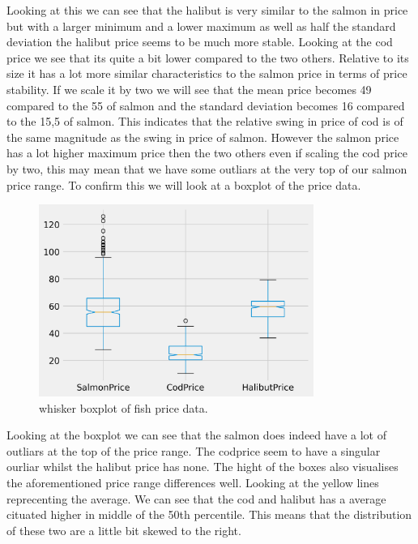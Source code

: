 Looking at this we can see that the halibut is very similar to the salmon in price but with a larger minimum and a lower maximum as well as half the standard deviation the halibut price seems to be much more stable. Looking at the cod price we see that its quite a bit lower compared to the two others. Relative to its size it has a lot more similar characteristics to the salmon price in terms of price stability. If we scale it by two we will see that the mean price becomes 49 compared to the 55 of salmon and the standard deviation becomes 16 compared to the 15,5 of salmon. This indicates that the relative swing in price of cod is of the same magnitude as the swing in price of salmon. However the salmon price has a lot higher maximum price then the two others even if scaling the cod price by two, this may mean that we have some outliars at the very top of our salmon price range. To confirm this we will look at a boxplot of the price data.

\begin{figure}[H]
    \centering
    \includegraphics[width=0.8\textwidth]{data/Figures/Descriptive/Whisker.png}
    \caption[Whisker boxplot of fish price data]{whisker boxplot of fish price data.}\label{fig:Whisker boxplot}
\end{figure}

Looking at the boxplot we can see that the salmon does indeed have a lot of outliars at the top of the price range. The codprice seem to have a singular ourliar whilst the halibut price has none. The hight of the boxes also visualises the aforementioned price range differences well. Looking at the yellow lines reprecenting the average. We can see that the cod and halibut has a average cituated higher in middle of the 50th percentile. This means that the distribution of these two are a  little bit skewed to the right.

